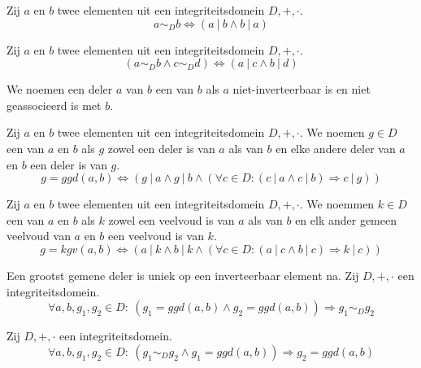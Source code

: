 \documentclass[main.tex]{subfiles}
\begin{document}
\begin{st}
  Zij $a$ en $b$ twee elementen uit een integriteitsdomein $D,+,\cdot$.
  \[ a \sim_{D} b \Leftrightarrow (a\ |\ b \wedge b\ |\ a) \]
\end{st}

\begin{st}
  Zij $a$ en $b$ twee elementen uit een integriteitsdomein $D,+,\cdot$.
  \[ (a \sim_{D} b \wedge c \sim_{D} d) \Leftrightarrow (a\ |\ c \wedge b\ |\ d) \]
\end{st}

\begin{de}
  We noemen een deler $a$ van $b$ een  van $b$ als $a$ niet-inverteerbaar is en niet geassocieerd is met $b$.
\end{de}

\begin{de}
  Zij $a$ en $b$ twee elementen uit een integriteitsdomein $D,+,\cdot$.
  We noemen $g\in D$ een  van $a$ en $b$ als $g$ zowel een deler is van $a$ als van $b$ en elke andere deler van $a$ en $b$ een deler is van $g$.
  \[ g = ggd(a,b) \Leftrightarrow (g\ |\ a \wedge g\ |\ b \wedge (\forall c\in D: (c\ |\ a \wedge c\ |\ b) \Rightarrow c\ |\ g)) \]
\end{de}

\begin{de}
  Zij $a$ en $b$ twee elementen uit een integriteitsdomein $D,+,\cdot$.
  We noemmen $k\in D$ een  van $a$ en $b$ als $k$ zowel een veelvoud is van $a$ als van $b$ en elk ander gemeen veelvoud van $a$ en $b$ een veelvoud is van $k$.
  \[ g = kgv(a,b) \Leftrightarrow (a\ |\ k \wedge b\ |\ k \wedge (\forall c\in D: (a\ |\ c \wedge b\ |\ c) \Rightarrow k\ |\ c)) \]
\end{de}

\begin{st}
  Een grootst gemene deler is uniek op een inverteerbaar element na.
  Zij $D,+,\cdot$ een integriteitsdomein.
  \[ \forall a,b,g_{1},g_{2} \in D:\ (g_{1} = ggd(a,b) \wedge g_{2} = ggd(a,b)) \Rightarrow g_{1} \sim_{D} g_{2} \]
\end{st}

\begin{st}
  Zij $D,+,\cdot$ een integriteitsdomein.
  \[ \forall a,b,g_{1},g_{2} \in D:\ (g_{1} \sim_{D} g_{2} \wedge g_{1} = ggd(a,b)) \Rightarrow g_{2} = ggd(a,b) \]
\end{st}
\end{document}
